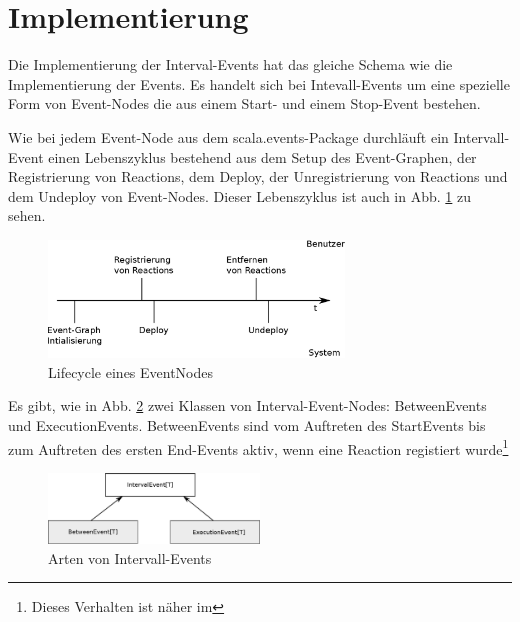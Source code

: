 \section{Implementierung}

Die Implementierung der Interval-Events hat das gleiche Schema wie die
Implementierung der Events. Es handelt sich bei Intevall-Events um eine
spezielle Form von Event-Nodes die aus einem Start- und einem Stop-Event
bestehen.

Wie bei jedem Event-Node aus dem scala.events-Package durchläuft ein
Intervall-Event einen Lebenszyklus bestehend aus dem Setup des Event-Graphen,
der Registrierung von Reactions, dem Deploy, der Unregistrierung von Reactions
und dem Undeploy von Event-Nodes. Dieser Lebenszyklus ist auch in
Abb. \ref{event_node_lifecycle} zu sehen.

\begin{figure}[htp]
\begin{center}
  \includegraphics[width=0.7\textwidth]{graphics/EventNode-Lifecycle}
  \caption[labelInTOC]{Lifecycle eines EventNodes}
  \label{event_node_lifecycle}
\end{center}
\end{figure}


Es gibt, wie in Abb. \ref{interval_events_structure} zwei Klassen von
Interval-Event-Nodes: BetweenEvents und ExecutionEvents. BetweenEvents sind vom
Auftreten des StartEvents bis zum Auftreten des ersten End-Events aktiv, wenn
eine Reaction registiert wurde\footnote{Dieses Verhalten ist näher im }

\begin{figure}[htp]
\begin{center}
  \includegraphics[width=0.5\textwidth]{graphics/interval_event_structure}
  \caption[labelInTOC]{Arten von Intervall-Events}
  \label{interval_events_structure}
\end{center}
\end{figure}

